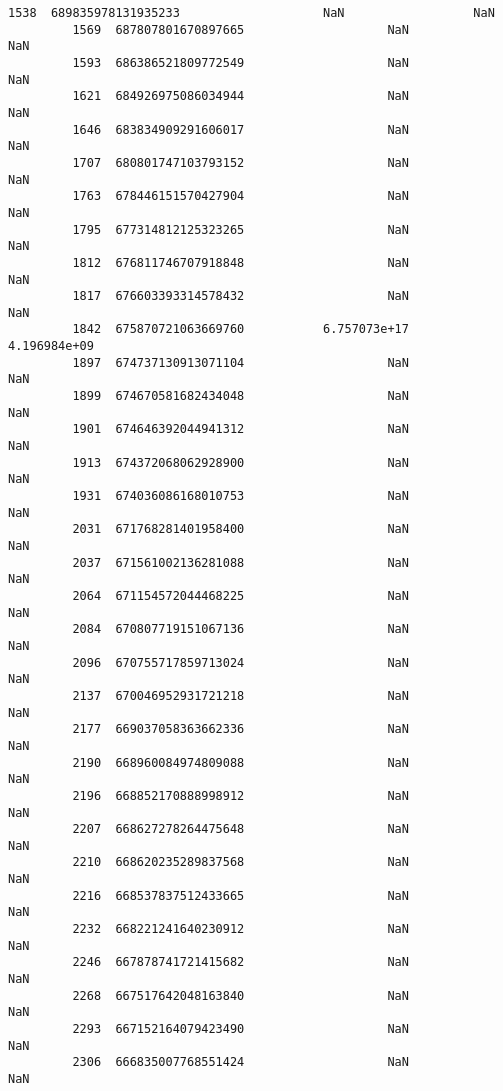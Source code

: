 \documentclass[11pt]{article}
\begin{document}
\begin{Verbatim}[commandchars=\\\{\}]
         1538  689835978131935233                    NaN                  NaN   
         1569  687807801670897665                    NaN                  NaN   
         1593  686386521809772549                    NaN                  NaN   
         1621  684926975086034944                    NaN                  NaN   
         1646  683834909291606017                    NaN                  NaN   
         1707  680801747103793152                    NaN                  NaN   
         1763  678446151570427904                    NaN                  NaN   
         1795  677314812125323265                    NaN                  NaN   
         1812  676811746707918848                    NaN                  NaN   
         1817  676603393314578432                    NaN                  NaN   
         1842  675870721063669760           6.757073e+17         4.196984e+09   
         1897  674737130913071104                    NaN                  NaN   
         1899  674670581682434048                    NaN                  NaN   
         1901  674646392044941312                    NaN                  NaN   
         1913  674372068062928900                    NaN                  NaN   
         1931  674036086168010753                    NaN                  NaN   
         2031  671768281401958400                    NaN                  NaN   
         2037  671561002136281088                    NaN                  NaN   
         2064  671154572044468225                    NaN                  NaN   
         2084  670807719151067136                    NaN                  NaN   
         2096  670755717859713024                    NaN                  NaN   
         2137  670046952931721218                    NaN                  NaN   
         2177  669037058363662336                    NaN                  NaN   
         2190  668960084974809088                    NaN                  NaN   
         2196  668852170888998912                    NaN                  NaN   
         2207  668627278264475648                    NaN                  NaN   
         2210  668620235289837568                    NaN                  NaN   
         2216  668537837512433665                    NaN                  NaN   
         2232  668221241640230912                    NaN                  NaN   
         2246  667878741721415682                    NaN                  NaN   
         2268  667517642048163840                    NaN                  NaN   
         2293  667152164079423490                    NaN                  NaN   
         2306  666835007768551424                    NaN                  NaN   
         

\end{Verbatim}
\end{document}
